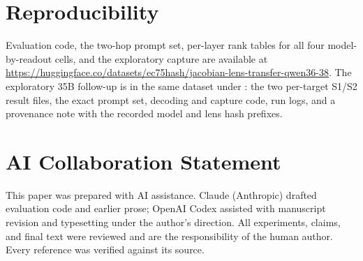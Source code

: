 \documentclass[10pt,a4paper,twocolumn]{article}
\begin{document}
\section*{Reproducibility}

Evaluation code, the two-hop prompt set, per-layer rank tables for all four
model-by-readout cells, and the exploratory capture are available at
\url{https://huggingface.co/datasets/ec75hash/jacobian-lens-transfer-qwen36-38}.
The exploratory 35B follow-up is in the same dataset under : the two per-target S1/S2 result files, the exact prompt set, decoding and capture code, run logs, and a provenance note with the recorded model and lens hash prefixes.

\section*{AI Collaboration Statement}

This paper was prepared with AI assistance. Claude (Anthropic) drafted
evaluation code and earlier prose; OpenAI Codex assisted with manuscript
revision and typesetting under the author's direction. All experiments,
claims, and final text were reviewed and are the responsibility of the human
author. Every reference was verified against its source.



\end{document}
